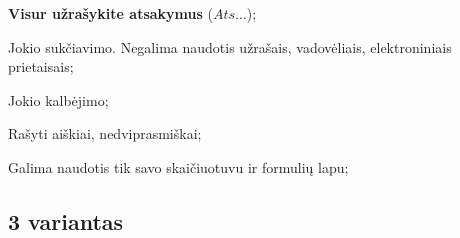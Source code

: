 \documentclass[a4paper]{article}
\begin{document}
\begin{small}
      \begin{enumerate*}[label={(\arabic*)}]
            \item \textbf{Visur užrašykite atsakymus} ($Ats\ldots$);
            \item Jokio sukčiavimo. Negalima naudotis užrašais, vadovėliais,
            elektroniniais prietaisais;
            \item Jokio kalbėjimo;
            \item Rašyti aiškiai, nedviprasmiškai;
            \item Galima naudotis tik savo skaičiuotuvu ir formulių lapu;
      \end{enumerate*}
\end{small}
\subsection*{3 variantas}
\end{document}
